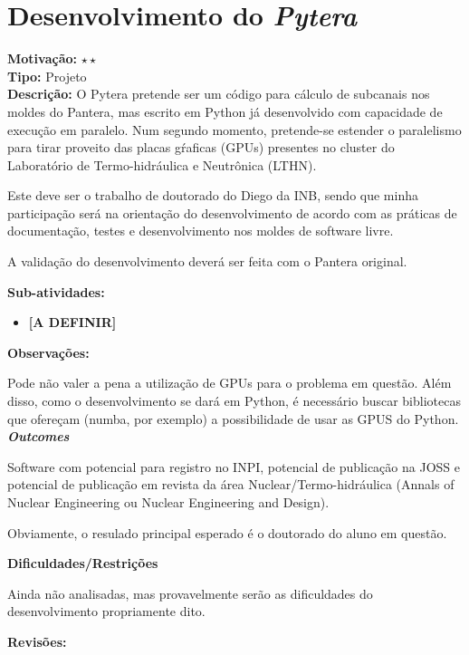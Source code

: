 \chapter{Desenvolvimento do \textit{Pytera}}

\textbf{Motivação:} $\star\star$\\

\textbf{Tipo:} Projeto\\

\textbf{Descrição:} O Pytera pretende ser um código para cálculo de subcanais 
nos moldes do Pantera, mas escrito em Python já desenvolvido com capacidade 
de execução em paralelo. Num segundo momento, pretende-se estender o paralelismo 
para tirar proveito das placas gŕaficas (GPUs) presentes no cluster do Laboratório 
de Termo-hidráulica e Neutrônica (LTHN).

Este deve ser o trabalho de doutorado do Diego da INB, sendo que minha participação 
será na orientação do desenvolvimento de acordo com as práticas de documentação, 
testes e desenvolvimento nos moldes de software livre.

A validação do desenvolvimento deverá ser feita com o Pantera original.

\textbf{Sub-atividades:}

\begin{itemize}
	\item \textbf{[A DEFINIR]}
\end{itemize}

\textbf{Observações:}

Pode não valer a pena a utilização de GPUs para o problema em questão. Além disso, 
como o desenvolvimento se dará em Python, é necessário buscar bibliotecas que 
ofereçam (numba, por exemplo) a possibilidade de usar as GPUS do Python.\\

\textbf{\textit{Outcomes}}

Software com potencial para registro no INPI, potencial de publicação na JOSS e 
potencial de publicação em revista da área Nuclear/Termo-hidráulica (Annals of 
Nuclear Engineering ou Nuclear Engineering and Design).

Obviamente, o resulado principal esperado é o doutorado do aluno em questão.

\textbf{Dificuldades/Restrições}

Ainda não analisadas, mas provavelmente serão as dificuldades do desenvolvimento 
propriamente dito.

\textbf{Revisões:}

\date{\today}
